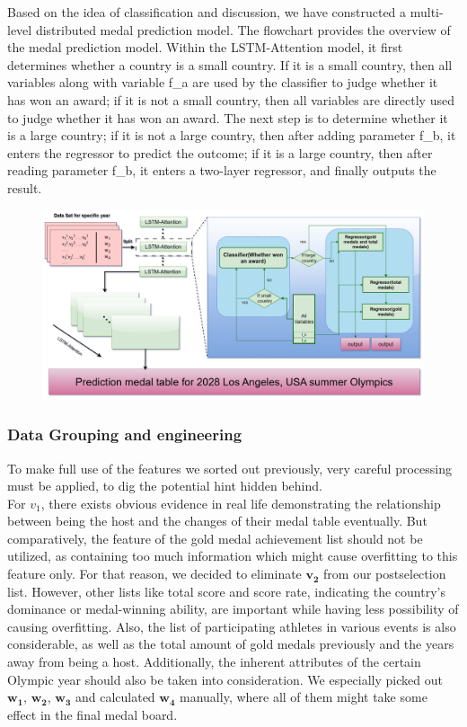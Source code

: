 \documentclass[12pt]{article}
\begin{document}
\quad \quad Based on the idea of classification and discussion, we have constructed a multi-level distributed medal prediction model. The flowchart provides the overview of the medal prediction model. Within the LSTM-Attention model, it first determines whether a country is a small country. If it is a small country, then all variables along with variable f\_a are used by the classifier to judge whether it has won an award; if it is not a small country, then all variables are directly used to judge whether it has won an award. The next step is to determine whether it is a large country; if it is not a large country, then after adding parameter f\_b, it enters the regressor to predict the outcome; if it is a large country, then after reading parameter f\_b, it enters a two-layer regressor, and finally outputs the result.

\begin{figure}[h] 
\centering
\includegraphics[width=17cm]{figure/model1.png}
\end{figure}

\subsubsection{Data Grouping and engineering}
\quad \quad To make full use of the features we sorted out previously, very careful processing must be applied, to dig the potential hint hidden behind.\\

 For $ v_1 $, there exists obvious evidence in real life demonstrating the relationship between being the host and the changes of their medal table eventually. But comparatively, the feature of the gold medal achievement list should not be utilized, as containing too much information which might cause overfitting to this feature only. For that reason, we decided to eliminate $ \bm{v_2} $ from our postselection list. However, other lists like total score and score rate, indicating the country's dominance or medal-winning ability, are important while having less possibility of causing overfitting. Also, the list of participating athletes in various events is also considerable, as well as the total amount of gold medals previously and the years away from being a host. Additionally, the inherent attributes of the certain Olympic year should also be taken into consideration. We especially picked out $ \bm{w_1} $, $ \bm{w_2} $, $ \bm{w_3} $ and calculated $ \bm{w_4} $ manually, where all of them might take some effect in the final medal board.\\
\end{document}
